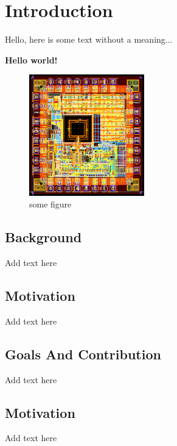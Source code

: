 \documentclass[../main.tex]{subfiles}
\begin{document}
\chapter{Introduction}
Hello, here is some text without a meaning...\cite{salemi2013uvm}

\textbf{Hello world!}

\begin{figure}[bh]
\centering
\includegraphics[width=5cm]{diagrams/MPW2Naretlayout.png}

\label{fig:img1}
\caption{some figure}
\end{figure}

\section{Background}
Add text here

\section{Motivation}
Add text here

\section{Goals And Contribution}
Add text here

\section{Motivation}
Add text here
\end{document}

